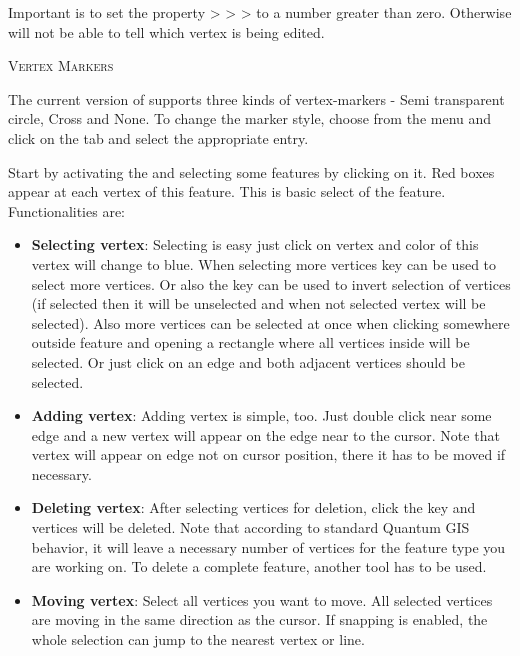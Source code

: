Important is to set the property  >
 >
> to a number greater than
zero. Otherwise \qg will not be able to tell which vertex is being edited.

\begin{Tip}\caption{\textsc{Vertex Markers}}
The current version of \qg supports three kinds of vertex-markers -
Semi transparent circle, Cross and None. To change the marker style, choose
 from the  menu
and click on the  tab and select the appropriate entry.
\end{Tip}


Start by activating the  and selecting
some features by clicking on it. Red boxes appear at each vertex of this feature.
This is basic select of the feature. Functionalities are:

\begin{itemize}[label=--]
\item \textbf{Selecting vertex}: Selecting is easy just click on vertex and
color of this vertex will change to blue. When selecting more vertices
 key can be used to select more vertices. Or also the
 key can be used to invert selection of vertices (if selected then
it will be unselected and when not selected vertex will be selected). Also more
vertices can be selected at once when clicking somewhere outside feature and opening a rectangle where all vertices inside will be selected. Or just click on an edge and
both adjacent vertices should be selected.
\item \textbf{Adding vertex}: Adding vertex is simple, too. Just double click near
some edge and a new vertex will appear on the edge near to the cursor. Note that
vertex will appear on edge not on cursor position, there it has to be moved if
necessary.
\item \textbf{Deleting vertex}: After selecting vertices for deletion, click the
 key and vertices will be deleted. Note that according to
standard Quantum GIS behavior, it will leave a necessary number of vertices for
the feature type you are working on. To delete a complete feature, another tool
has to be used.
\item \textbf{Moving vertex}: Select all vertices you want to move. All selected
vertices are moving in the same direction as the cursor. If snapping is enabled,
the whole selection can jump to the nearest vertex or line.
\end{itemize}

